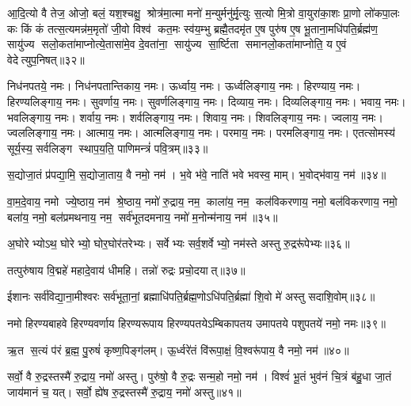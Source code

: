 आ॒दि॒त्यो वै तेज॒ ओजो॒ बलं॒ यश॒श्चक्षु॒ श्रोत्र॑मा॒त्मा मनो॑ म॒न्युर्मनु॑र्मृ॒त्युः स॒त्यो मि॒त्रो वा॒युरा॑का॒शः प्रा॒णो लो॑कपा॒लः कः किं कं तत्स॒त्यमन्न॑म॒मृतो॑ जी॒वो विश्व॑ कत॒मः स्व॑य॒म्भु ब्रह्मै॒तदमृ॑त ए॒ष पुरु॑ष ए॒ष भू॒ताना॒मधि॑पति॒र्ब्रह्म॑ण॒ सायु॑ज्य सलो॒कता॑माप्नोत्ये॒तासा॑मे॒व दे॒वता॑ना॒ सायु॑ज्य सा॒र्ष्टिता समानलो॒कता॑माप्नोति॒ य ए॒वं वेदेत्युप॒निषत्॥३२॥
\anuvakamend

निध॑नपतये॒ नमः। निध॑नपतान्तिकाय॒ नमः। ऊर्ध्वाय॒ नमः। ऊर्ध्वलिङ्गाय॒ नमः। हिरण्याय॒ नमः। हिरण्यलिङ्गाय॒ नमः। सुवर्णाय॒ नमः। सुवर्णलिङ्गाय॒ नमः। दिव्याय॒ नमः। दिव्यलिङ्गाय॒ नमः। भवाय॒ नमः। भवलिङ्गाय॒ नमः। शर्वाय॒ नमः। शर्वलिङ्गाय॒ नमः। शिवाय॒ नमः। शिवलिङ्गाय॒ नमः। ज्वलाय॒ नमः। ज्वललिङ्गाय॒ नमः। आत्माय॒ नमः। आत्मलिङ्गाय॒ नमः। परमाय॒ नमः। परमलिङ्गाय॒ नमः। एतत्सोमस्य॑ सूर्य॒स्य॒ सर्वलिङ्ग स्थाप॒य॒ति॒ पाणिमन्त्रं॑ पवि॒त्रम्॥३३॥
\anuvakamend

स॒द्योजा॒तं प्र॑पद्या॒मि॒ स॒द्योजा॒ताय॒ वै नमो॒ नम॑। भ॒वे भ॑वे॒ नाति॑ भवे भवस्व॒ माम्। भ॒वोद्भ॑वाय॒ नम॑॥३४॥
\anuvakamend

वा॒म॒दे॒वाय॒ नमो ज्ये॒ष्ठाय॒ नम॑ श्रे॒ष्ठाय॒ नमो॑ रु॒द्राय॒ नम॒ काला॑य॒ नम॒ कल॑विकरणाय॒ नमो॒ बल॑विकरणाय॒ नमो॒ बला॑य॒ नमो॒ बल॑प्रमथनाय॒ नम॒ सर्व॑भूतदमनाय॒ नमो॑ म॒नोन्म॑नाय॒ नम॑॥३५॥\anuvakamend

अ॒घोरेभ्योऽथ॒ घोरेभ्यो॒ घोर॒घोर॑तरेभ्यः। सर्वेभ्यः सर्व॒शर्वेभ्यो॒ नम॑स्ते अस्तु रु॒द्ररू॑पेभ्यः॥३६॥
\anuvakamend

तत्पुरु॑षाय वि॒द्महे॑ महादे॒वाय॑ धीमहि। तन्नो॑ रुद्रः प्रचो॒दयात्॥३७॥
\anuvakamend

ईशानः सर्व॑विद्या॒ना॒मीश्वरः सर्व॑भूता॒नां॒ ब्रह्माधि॑पति॒र्ब्रह्म॒णो\-ऽधि॑पति॒र्ब्रह्मा॑ शि॒वो मे॑ अस्तु सदाशि॒वोम्॥३८॥
\anuvakamend

नमो हिरण्यबाहवे हिरण्यवर्णाय हिरण्यरूपाय हिरण्यपतये\-ऽम्बिकापतय उमापतये पशुपतये॑ नमो॒ नमः॥३९॥
\anuvakamend

ऋ॒त स॒त्यं प॑रं ब्र॒ह्म॒ पु॒रुषं॑ कृष्ण॒पिङ्ग॑लम्। ऊ॒र्ध्वरे॑तं वि॑रूपा॒क्षं॒ वि॒श्वरू॑पाय॒ वै नमो॒ नम॑॥४०॥
\anuvakamend

सर्वो॒ वै रु॒द्रस्तस्मै॑ रु॒द्राय॒ नमो॑ अस्तु। पुरु॑षो॒ वै रु॒द्रः सन्म॒हो नमो॒ नम॑। विश्वं॑ भू॒तं भुव॑नं चि॒त्रं ब॑हु॒धा जा॒तं जाय॑मानं च॒ यत्। सर्वो॒ ह्ये॑ष रु॒द्रस्तस्मै॑ रु॒द्राय॒ नमो॑ अस्तु॥४१॥
\anuvakamend


